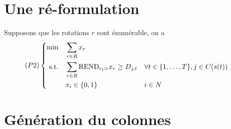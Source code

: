\documentclass[a4paper]{article}
\begin{document}
\section{Une ré-formulation}
Supposons que les rotations $r$ sont énumérable, on a
\begin{equation*}
    (P2) \left\{ 
    \begin{aligned}
    \min\quad        & \sum_{r \in R} x_{r}   \\
    \text{s.t.\quad} & \sum_{r \in R} \text{REND}_{r_t = } x_{r} \geq D_{j,t} & & \forall t\in \{1, \ldots, T\}, j \in C(s(t))\\
                     & x_i \in \{0,1\}            & & i\in N
  \end{aligned}
\right.
\end{equation*}
\section{Génération du colonnes}
\end{document}
